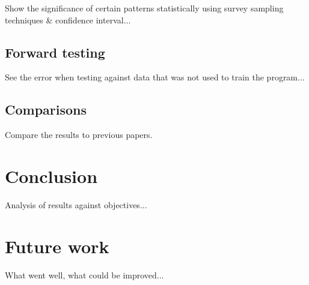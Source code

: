 \documentclass{article}
\theoremstyle{definition}
\begin{document}
Show the significance of certain patterns statistically using survey sampling techniques \& confidence interval...

\subsection{Forward testing}

See the error when testing against data that was not used to train the program...

\subsection{Comparisons}

Compare the results to previous papers.

\section{Conclusion}

Analysis of results against objectives...

\section{Future work}

What went well, what could be improved...



\end{document}
